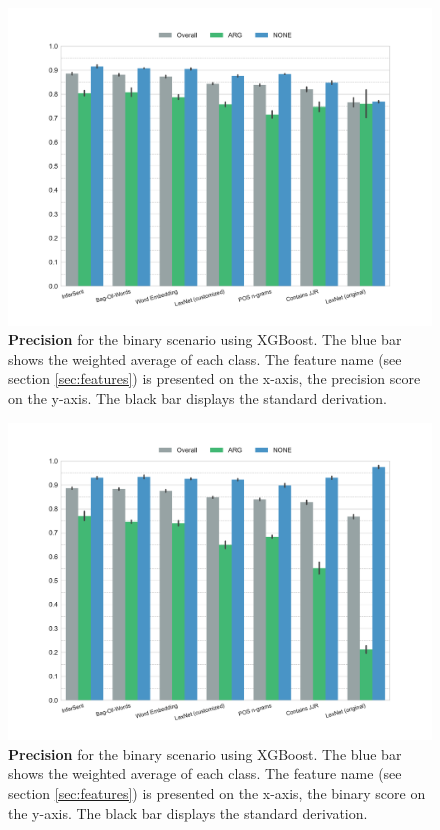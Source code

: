 \begin{figure}[htbp]
         \caption{\textbf{Precision} for the binary scenario using XGBoost. The blue bar shows the weighted average of each class. The feature name (see section \ref{sec:features}) is presented on the x-axis, the precision score on the y-axis. The black bar displays the standard derivation.} 
    \label{fig:2_precision}
    \centering
	\includegraphics[width=1\linewidth]{images/experiments/precision-True}
    \end{figure}
    
    \begin{figure}[tb]
              \caption{\textbf{Precision} for the binary scenario using XGBoost. The blue bar shows the weighted average of each class. The feature name (see section \ref{sec:features}) is presented on the x-axis, the binary score on the y-axis. The black bar displays the standard derivation.} 
       \label{fig:2_recall}
 \centering
	\includegraphics[width=1\linewidth]{images/experiments/recall-True}

\end{figure}



